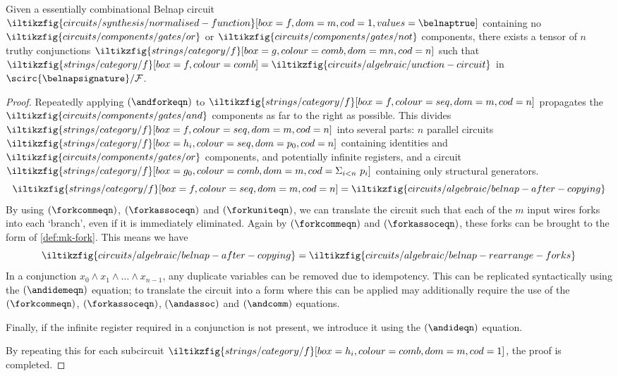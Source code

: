 \begin{lemma}\label{lem:conjunction-normalising}
    Given a essentially combinational Belnap circuit \(
    \iltikzfig{circuits/synthesis/normalised-function}[box=f,dom=m,cod=1,values=\belnaptrue]
    \) containing no \(
    \iltikzfig{circuits/components/gates/or}
    \) or \(
    \iltikzfig{circuits/components/gates/not}
    \) components, there exists a tensor of \(n\) truthy conjunctions \(
    \iltikzfig{strings/category/f}[box=g,colour=comb,dom=mn,cod=n]
    \) such that \(
    \iltikzfig{strings/category/f}[box=f,colour=comb]
    =
    \iltikzfig{circuits/algebraic/unction-circuit}
    \) in \(\scirc{\belnapsignature} / \mathcal{F}\).
\end{lemma}
\begin{proof}
    Repeatedly applying \((\andforkeqn)\) to \(
    \iltikzfig{strings/category/f}[box=f,colour=seq,dom=m,cod=n]
    \) propagates the \(
    \iltikzfig{circuits/components/gates/and}
    \) components as far to the right
    as possible.
    This divides \(
    \iltikzfig{strings/category/f}[box=f,colour=seq,dom=m,cod=n]
    \) into several parts: \(n\) parallel circuits \(
    \iltikzfig{strings/category/f}[box=h_i,colour=seq,dom=p_0,cod=n]
    \) containing identities and \(
    \iltikzfig{circuits/components/gates/or}
    \) components, and potentially infinite registers, and a circuit \(
    \iltikzfig{strings/category/f}[box=g_0,colour=comb,dom=m,cod={\Sigma_{i<n}\ p_i}]
    \) containing only structural generators.
    \[
        \iltikzfig{strings/category/f}[box=f,colour=seq,dom=m,cod=n]
        =
        \iltikzfig{circuits/algebraic/belnap-after-copying}
    \]
    By using \((\forkcommeqn)\), \((\forkassoceqn)\) and \((\forkuniteqn)\),
    we can translate the circuit such that each of the \(m\) input wires forks
    into each `branch', even if it is immediately eliminated.
    Again by \((\forkcommeqn)\) and \((\forkassoceqn)\), these forks can be
    brought to the form of \cref{def:mk-fork}.
    This means we have \[
        \iltikzfig{circuits/algebraic/belnap-after-copying}
        =
        \iltikzfig{circuits/algebraic/belnap-rearrange-forks}
    \]
    In a conjunction \(x_0 \land x_1 \land \dots \land x_{n-1}\), any duplicate
    variables can be removed due to idempotency.
    This can be replicated syntactically using the \((\andidemeqn)\) equation;
    to translate the circuit into a form where this can be applied may
    additionally require the use of the \((\forkcommeqn)\), \((\forkassoceqn)\),
    \((\andassoc)\) and \((\andcomm)\) equations.

    Finally, if the infinite register required in a conjunction is not present,
    we introduce it using the \((\andideqn)\) equation.

    By repeating this for each subcircuit \(
    \iltikzfig{strings/category/f}[box=h_i,colour=comb,dom=m,cod=1]
    \), the proof is completed.
\end{proof}

